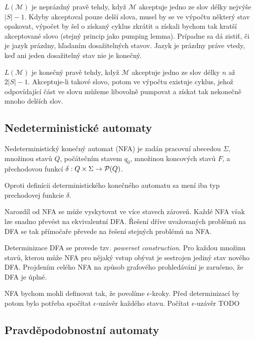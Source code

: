 $L(\mathcal{M})$ je neprázdný pravě tehdy, když $\mathcal{M}$
akceptuje jedno ze slov délky nejvýše $\lvert S \rvert -1$.
Kdyby akceptoval pouze delší slova, musel by se ve výpočtu některý stav
opakovat, výpočet by šel o získaný cyklus zkrátit a získali bychom tak
kratší akceptované slovo (stejný princip jako pumping lemma).
Prípadne sa dá zistiť, či je jazyk prázdny, hľadaním dosažitelných
stavov. Jazyk je prázdny práve vtedy, keď ani jeden dosažitelný stav 
nie je konečný.

$L(\mathcal{M})$ je konečný pravě tehdy, když $\mathcal{M}$
akceptuje jedno ze slov délky $n$ až $2 \lvert S \rvert - 1$.
Akceptuje-li takové slovo, potom ve výpočtu existuje cyklus, jehož
odpovídající část ve slovu můžeme libovolně pumpovat a získat tak
nekonečně mnoho delších slov.

\subsection{Nedeterministické automaty}

\begin{definition}
    Nedeterministický konečný automat (NFA) je zadán
    pracovní abecedou $\Sigma$,
    množinou stavů $Q$,
    počátečním stavem $q_0$,
    množinou koncových stavů $F$,
    a přechodovou funkcí $\delta : Q \times \Sigma \to \mathcal{P}(Q)$.
\end{definition}

Oproti definícii deterministického konečného automatu sa mení iba
typ prechodovej funkcie $\delta$.

Narozdíl od NFA se může vyskytovat ve více stavech zároveň. Každé NFA
však lze snadno převést na ekvivalentní DFA. Řešení dříve uvažovaných
problémů na DFA se tak přímočaře převede na řešení stejných problémů na
NFA.

Determinizace DFA se provede tzv. {\em powerset construction}. Pro
každou množinu stavů, kterou může NFA pro nějaký vstup obývat je
sestrojen jediný stav nového DFA. Projdením celého NFA na způsob
grafového prohledávání je zaručeno, že DFA je úplné.

NFA bychom mohli definovat tak, že povolíme $\epsilon$-kroky. Před
determinizací by potom bylo potřeba spočítat $\epsilon$-uzávěr každého
stavu. Počítat $\epsilon$-uzávěr TODO

\subsection{Pravděpodobnostní automaty}

